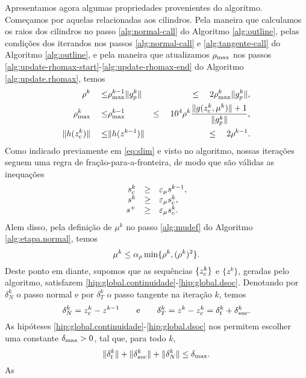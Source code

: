 Apresentamos agora algumas propriedades provenientes do algoritmo.
Começamos por aquelas relacionadas aos cilindros.
Pela maneira que calculamos os raios dos cilindros no passo
\ref{alg:normal-call} do Algoritmo \ref{alg:outline}, pelas condições dos
iterandos nos passos \ref{alg:normal-call} e \ref{alg:tangente-call} do Algoritmo
\ref{alg:outline}, e pela maneira que atualizamos $\rho_{\max}$ nos passos
\ref{alg:update-rhomax-start}-\ref{alg:update-rhomax-end} do Algoritmo
\ref{alg:update.rhomax}, temos
\begin{eqnarray}
  \rho^k \quad \leq & \rhomax^{k-1}\norma{g_p^k} & \leq \quad
    2\rhomax^k\norma{g_p^k} \visiblelbl{limrho}, \\
  \rhomax^k \quad \leq & \rhomax^{k-1} & \leq \quad
    10^4\rho^k\frac{\norma{g(\zc{k},\mu^k)} + 1} {\norma{\gpk{k}}},
    \visiblelbl{limrhomax} \\
  \norma{h(\zc{k})} \quad \leq & \norma{h(z^{k-1})} & \leq \quad 2\rho^{k-1}.
    \visiblelbl{limhhornormal}
\end{eqnarray}
Como indicado previamente em \eqref{eq:slim} e visto no algoritmo, nossas
iterações seguem uma regra de fração-para-a-fronteira, de modo que são válidas
as inequações
\begin{eqnarray}\visiblelbl{zbound}
 \begin{array}{rcl}
  s_c^{k} & \geq & \epsmu s^{k-1}, \\
  s^{k} & \geq & \epsmu s_c^{k}, \\
  s^+ & \geq & \epsmu s_c^k.
 \end{array}
\end{eqnarray}
Alem disso, pela definição de $\mu^k$ no passo \ref{alg:mudef} do Algoritmo
\ref{alg:etapa.normal}, temos
\begin{equation}\visiblelbl{limmu}
  \mu^k \leq \alpha_{\rho}\min\{\rho^k,(\rho^k)^2\}.
\end{equation}
Deste ponto em diante, supomos que as sequências $\{z_c^{k}\}$ e $\{z^k\}$,
geradas pelo algoritmo, satisfazem
\ref{hip:global.continuidade}-\ref{hip:global.dsoc}. Denotando por $\delta_N^k$
o passo normal e por $\delta_T^k$ o passo tangente na iteração $k$, temos
\begin{equation*} \delta_N^k = z_c^k - z^{k-1} \qquad \mbox{e} \qquad \delta_T^k
= z^k - z_c^{k} = \delta_t^k + \delta_{soc}^k.  \end{equation*} As hipóteses
\ref{hip:global.continuidade}-\ref{hip:global.dsoc} nos permitem escolher uma
constante $\delta_{\max} > 0$, tal que, para todo $k$,
\begin{equation}\visiblelbl{limdmax} 
  \norma{\delta_t^k} + \norma{\dsoc^k} + \norma{\delta_N^k} \leq \dmax.  
\end{equation} As
